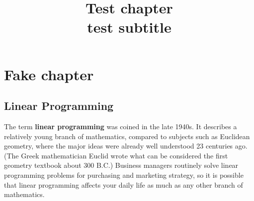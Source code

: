 \documentclass[10pt,]{book}
\title{Test chapter\\
{\large test subtitle}}
\author{}
\date{}
\newcommand{\terminology}[1]{\textbf{#1}}
\theoremstyle{plain}
\theoremstyle{definition}
\theoremstyle{definition}
\theoremstyle{definition}
\numberwithin{equation}{part}
\begin{document}
\typeout{************************************************}
\typeout{************************************************}
\chapter[{Fake chapter}]{Fake chapter}\label{testchap}
\typeout{************************************************}
\typeout{************************************************}
\typeout{************************************************}
\typeout{************************************************}
\section[{Linear Programming}]{Linear Programming}\label{Linear-Programming}
The term \terminology{linear programming} was coined in the late 1940s. It describes a relatively young branch of mathematics, compared to subjects such as Euclidean geometry, where the major ideas were already well understood 23 centuries ago. (The Greek mathematician Euclid wrote what can be considered the first geometry textbook about 300 B.C.) Business managers routinely solve linear programming problems for purchasing and marketing strategy, so it is possible that linear programming affects your daily life as much as any other branch of mathematics.%
\typeout{************************************************}
\typeout{************************************************}
\end{document}
